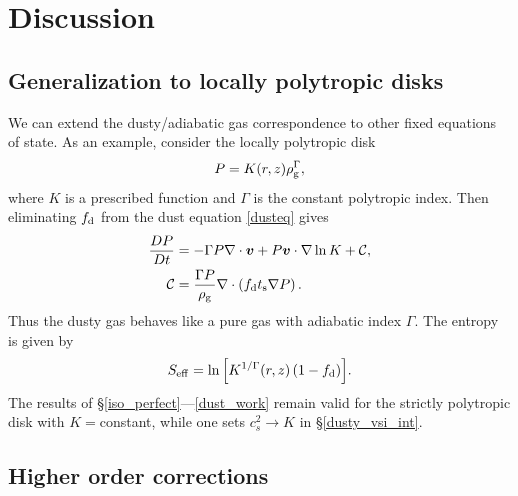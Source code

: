 \section{Discussion}\label{discussion}

\subsection{Generalization to locally polytropic disks}\label{gen_poly}

We can extend the dusty/adiabatic gas correspondence to 
other fixed equations of state. As an example, consider the locally
polytropic disk 
\begin{align}
  P = K(r,z)\rho_\mathrm{g}^{\Gamma}, 
\end{align}
where $K$ is a prescribed function and $\Gamma$ is the constant
polytropic index. Then eliminating $f_\mathrm{d}$ from the dust equation
\ref{dusteq} gives 
\begin{align}\label{poly_energy}
  \frac{D P}{D t} &= - \Gamma P\nabla\cdot\bm{v}  + P \bm{v}\cdot\nabla
  \ln{K} + \mathcal{C},\\
  \mathcal{C}& = \frac{\Gamma P}{\rho_\mathrm{g}}\nabla\cdot\left(f_\mathrm{d}t_\mathrm{s}\nabla
  P\right).
\end{align}
Thus the dusty gas behaves like a pure gas with adiabatic index
$\Gamma$. The entropy is given by 
\begin{align}
  S_\mathrm{eff} = \ln{\left[K^{1/\Gamma}(r,z)\left(1 - f_\mathrm{d}\right)\right]}.  
\end{align}
The results of \S\ref{iso_perfect}---\ref{dust_work} remain valid for the strictly 
polytropic disk with $K=$constant, while one sets $c_s^2\to K$ in
\S\ref{dusty_vsi_int}. 

\subsection{Higher order corrections}

